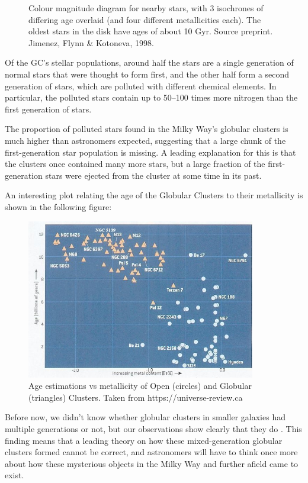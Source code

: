 \begin{figure}[H]
\begin{minipage}[b]{0.54\textwidth}
    \caption[HR Diagram for Stars]{Colour magnitude diagram for nearby stars, with 3 isochrones of differing age overlaid (and four different metallicities each). The oldest stars in the disk have ages of about 10 Gyr. Source preprint. Jimenez, Flynn \& Kotoneva, 1998.}
  \end{minipage}
\end{figure}
 
Of the GC's stellar populations, around half the stars are a single generation of normal stars that were thought to form first, and the other half form a second generation of stars, which are polluted with different chemical elements. In particular, the polluted stars contain up to 50–100 times more nitrogen than the first generation of stars.

The proportion of polluted stars found in the Milky Way's globular clusters is much higher than astronomers expected, suggesting that a large chunk of the first-generation star population is missing. A leading explanation for this is that the clusters once contained many more stars, but a large fraction of the first-generation stars were ejected from the cluster at some time in its past.

An interesting plot relating the age of the Globular Clusters to their metallicity is shown in the following figure:

\begin{figure}[H]
\centering
\includegraphics[width=10cm]{images/metallicity_gcs.jpg}
\caption[Age vs Metallicity for some Globular Clusters]{Age estimations vs metallicity of Open (circles) and Globular (triangles) Clusters. Taken from https://universe-review.ca}
\end{figure}

Before now, we didn't know whether globular clusters in smaller galaxies had multiple generations or not, but our observations show clearly that they do \cite{15}. This finding means that a leading theory on how these mixed-generation globular clusters formed cannot be correct, and astronomers will have to think once more about how these mysterious objects in the Milky Way and further afield came to exist.

